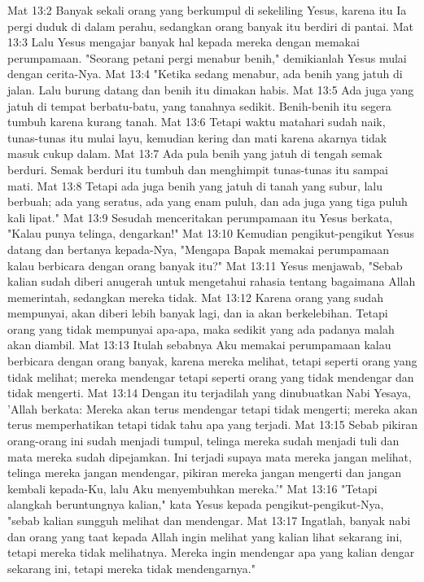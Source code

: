 Mat 13:2  Banyak sekali orang yang berkumpul di sekeliling Yesus, karena itu Ia pergi duduk di dalam perahu, sedangkan orang banyak itu berdiri di pantai.
Mat 13:3  Lalu Yesus mengajar banyak hal kepada mereka dengan memakai perumpamaan. "Seorang petani pergi menabur benih," demikianlah Yesus mulai dengan cerita-Nya.
Mat 13:4  "Ketika sedang menabur, ada benih yang jatuh di jalan. Lalu burung datang dan benih itu dimakan habis.
Mat 13:5  Ada juga yang jatuh di tempat berbatu-batu, yang tanahnya sedikit. Benih-benih itu segera tumbuh karena kurang tanah.
Mat 13:6  Tetapi waktu matahari sudah naik, tunas-tunas itu mulai layu, kemudian kering dan mati karena akarnya tidak masuk cukup dalam.
Mat 13:7  Ada pula benih yang jatuh di tengah semak berduri. Semak berduri itu tumbuh dan menghimpit tunas-tunas itu sampai mati.
Mat 13:8  Tetapi ada juga benih yang jatuh di tanah yang subur, lalu berbuah; ada yang seratus, ada yang enam puluh, dan ada juga yang tiga puluh kali lipat."
Mat 13:9  Sesudah menceritakan perumpamaan itu Yesus berkata, "Kalau punya telinga, dengarkan!"
Mat 13:10  Kemudian pengikut-pengikut Yesus datang dan bertanya kepada-Nya, "Mengapa Bapak memakai perumpamaan kalau berbicara dengan orang banyak itu?"
Mat 13:11  Yesus menjawab, "Sebab kalian sudah diberi anugerah untuk mengetahui rahasia tentang bagaimana Allah memerintah, sedangkan mereka tidak.
Mat 13:12  Karena orang yang sudah mempunyai, akan diberi lebih banyak lagi, dan ia akan berkelebihan. Tetapi orang yang tidak mempunyai apa-apa, maka sedikit yang ada padanya malah akan diambil.
Mat 13:13  Itulah sebabnya Aku memakai perumpamaan kalau berbicara dengan orang banyak, karena mereka melihat, tetapi seperti orang yang tidak melihat; mereka mendengar tetapi seperti orang yang tidak mendengar dan tidak mengerti.
Mat 13:14  Dengan itu terjadilah yang dinubuatkan Nabi Yesaya, 'Allah berkata: Mereka akan terus mendengar tetapi tidak mengerti; mereka akan terus memperhatikan tetapi tidak tahu apa yang terjadi.
Mat 13:15  Sebab pikiran orang-orang ini sudah menjadi tumpul, telinga mereka sudah menjadi tuli dan mata mereka sudah dipejamkan. Ini terjadi supaya mata mereka jangan melihat, telinga mereka jangan mendengar, pikiran mereka jangan mengerti dan jangan kembali kepada-Ku, lalu Aku menyembuhkan mereka.'"
Mat 13:16  "Tetapi alangkah beruntungnya kalian," kata Yesus kepada pengikut-pengikut-Nya, "sebab kalian sungguh melihat dan mendengar.
Mat 13:17  Ingatlah, banyak nabi dan orang yang taat kepada Allah ingin melihat yang kalian lihat sekarang ini, tetapi mereka tidak melihatnya. Mereka ingin mendengar apa yang kalian dengar sekarang ini, tetapi mereka tidak mendengarnya."
